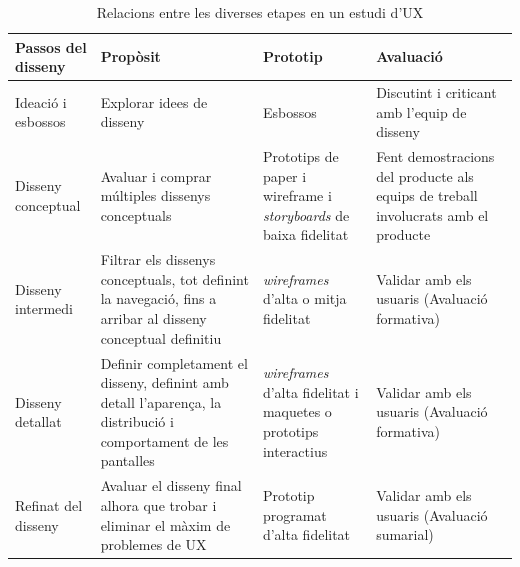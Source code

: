 \begin{table}
\caption{Relacions entre les diverses etapes en un estudi d'\ac{UX}}
\label{table:UX_sum_up}
\begin{tabular}{ | p{1.8cm} | p{5cm} | p{3cm} | p{3cm} |}
\hline
\textbf{Passos del disseny} & \textbf{Propòsit} & \textbf{Prototip} & \textbf{Avaluació} \\
\hline
Ideació i esbossos & Explorar idees de disseny & Esbossos & Discutint i criticant amb l'equip de disseny \\
\hline
Disseny conceptual & Avaluar i comprar múltiples dissenys conceptuals & Prototips de paper i \gls{wireframe} i \textit{storyboards} de baixa fidelitat &  Fent demostracions del producte als equips de treball involucrats amb el producte\\ 
\hline
Disseny intermedi & Filtrar els dissenys conceptuals, tot definint la navegació, fins a arribar al disseny conceptual definitiu & \textit{wireframes} d'alta o mitja fidelitat & Validar amb els usuaris (Avaluació formativa)\\
\hline
Disseny detallat & Definir completament el disseny, definint amb detall l'aparença, la distribució i comportament de les pantalles & \textit{wireframes} d'alta fidelitat i maquetes o prototips interactius & Validar amb els usuaris (Avaluació formativa)\\
\hline
Refinat del disseny & Avaluar el disseny final alhora que trobar i eliminar el màxim de problemes de \ac{UX} & Prototip programat d'alta fidelitat& Validar amb els usuaris (Avaluació sumarial) \\
\hline
\end{tabular}
\end{table}